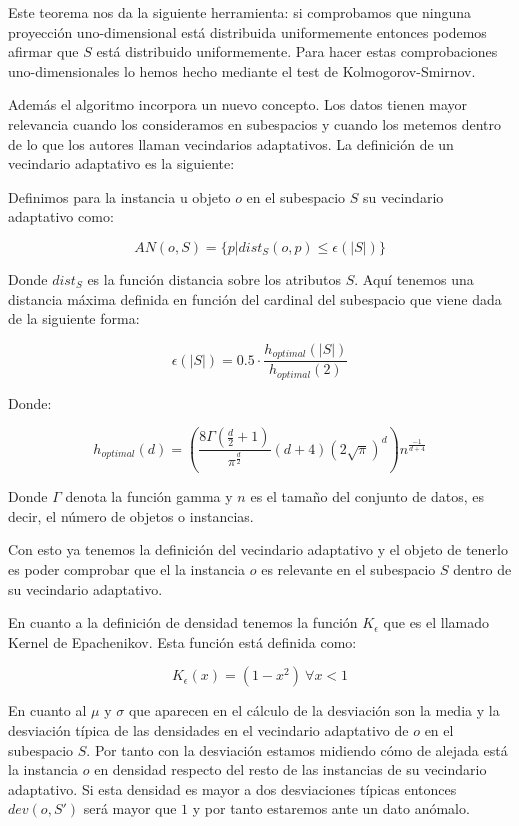 Este teorema nos da la siguiente herramienta: si comprobamos que ninguna proyección uno-dimensional está distribuida uniformemente entonces podemos afirmar que $S$ está distribuido uniformemente. Para hacer estas comprobaciones uno-dimensionales lo hemos hecho mediante el test de Kolmogorov-Smirnov. 

Además el algoritmo incorpora un nuevo concepto. Los datos tienen mayor relevancia cuando los consideramos en subespacios y cuando los metemos dentro de lo que los autores llaman vecindarios adaptativos. La definición de un vecindario adaptativo es la siguiente:

\begin{definicion}
	Definimos para la instancia u objeto $o$ en el subespacio $S$ su vecindario adaptativo como:
	
	$$AN(o,S) = \{ p | dist_{S}(o,p)\leq \epsilon (|S|) \}$$
\end{definicion}

Donde $dist_{S}$ es la función distancia sobre los atributos $S$. Aquí tenemos una distancia máxima definida en función del cardinal del subespacio que viene dada de la siguiente forma:

$$\epsilon (|S|) = 0.5 \cdot \frac{h_{optimal}(|S|)}{h_{optimal}(2)}$$

Donde:

$$h_{optimal} (d) = (\frac{8\Gamma (\frac{d}{2} + 1)}{\pi^{\frac{d}{2}}}(d+4)(2\sqrt{\pi})^d) n^{\frac{-1}{d+4}}$$

Donde $\Gamma$ denota la función gamma y $n$ es el tamaño del conjunto de datos, es decir, el número de objetos o instancias.

Con esto ya tenemos la definición del vecindario adaptativo y el objeto de tenerlo es poder comprobar que el la instancia $o$ es relevante en el subespacio $S$ dentro de su vecindario adaptativo.

En cuanto a la definición de densidad tenemos la función $K_{\epsilon}$ que es el llamado Kernel de Epachenikov. Esta función está definida como:

$$K_{\epsilon}(x) = (1-x^2) \ \forall x<1$$

En cuanto al $\mu$ y $\sigma$ que aparecen en el cálculo de la desviación son la media y la desviación típica de las densidades en el vecindario adaptativo de $o$ en el subespacio $S$. Por tanto con la desviación estamos midiendo cómo de alejada está la instancia $o$ en densidad respecto del resto de las instancias de su vecindario adaptativo. Si esta densidad es mayor a dos desviaciones típicas entonces $dev(o,S')$ será mayor que $1$ y por tanto estaremos ante un dato anómalo.

